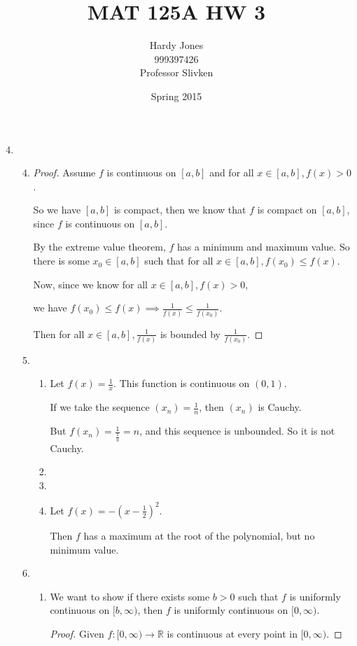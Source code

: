 \documentclass[12pt,letterpaper]{article}
\title{MAT 125A HW 3\vspace{-2ex}}
\author{Hardy Jones\\
        999397426\\
        Professor Slivken\vspace{-2ex}}
\date{Spring 2015}
\newcommand\uc{uniformly continuous }
\begin{document}
  \maketitle

  \begin{enumerate}
    \setcounter{enumi}{3}
    \item
      \begin{enumerate}
        \setcounter{enumii}{3}
        \item

          \begin{proof}
            Assume $f$ is continuous on $[a, b]$ and for all $x \in [a, b], f(x) > 0$.

            So we have $[a, b]$ is compact,
            then we know that $f$ is compact on $[a, b]$, since $f$ is continuous on $[a, b]$.

            By the extreme value theorem, $f$ has a minimum and maximum value.
            So there is some $x_0 \in [a, b]$ such that for all $x \in [a, b], f(x_0) \leq f(x)$.

            Now, since we know for all $x \in [a, b], f(x) > 0$,

            we have $f(x_0) \leq f(x) \implies \frac{1}{f(x)} \leq \frac{1}{f(x_0)}$.

            Then for all $x \in [a, b], \frac{1}{f(x)}$ is bounded by $\frac{1}{f(x_0)}$.
          \end{proof}
        \setcounter{enumii}{5}
        \item
          \begin{enumerate}
            \item
              Let $f(x) = \frac{1}{x}$.
              This function is continuous on $(0, 1)$.

              If we take the sequence $(x_n) = \frac{1}{n}$,
              then $(x_n)$ is Cauchy.

              But $f(x_n) = \frac{1}{\frac{1}{n}} = n$, and this sequence is unbounded.
              So it is not Cauchy.
            \item
            \item
            \item
              Let $f(x) = -\left(x - \frac{1}{2}\right)^2$.

              Then $f$ has a maximum at the root of the polynomial, but no minimum value.
          \end{enumerate}
        \setcounter{enumii}{7}
        \item
          \begin{enumerate}
            \item
              We want to show
              if there exists some $b > 0$ such that $f$ is \uc on $[b, \infty)$,
              then $f$ is \uc on $[0, \infty)$.
              \begin{proof}
                Given $f : [0, \infty) \to \mathbb{R}$ is continuous at every point in $[0, \infty)$.


\end{proof}
\end{enumerate}
\end{enumerate}
\end{enumerate}
\end{document}
